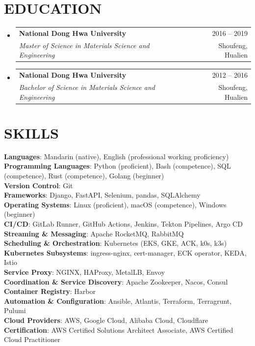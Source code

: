 \documentclass[letterpaper,11pt]{article}
\makeatletter
\newcommand{\resumeSubheading}[4]{
  \vspace{-1pt}\item
    \begin{tabular*}{\textwidth}[t]{l@{\extracolsep{\fill}}r}
      \textbf{#1} & {\color{dark-grey}\small #2}\vspace{1pt}\\
      \textit{#3} & {\color{dark-grey} \small #4}\\
    \end{tabular*}\vspace{-4pt}
}
\newcommand{\resumeSubHeadingListStart}{\begin{itemize}[leftmargin=0in, label={}]}
\newcommand{\resumeSubHeadingListEnd}{\end{itemize}}
\makeatother
\begin{document}
\section{EDUCATION}
\resumeSubHeadingListStart
\resumeSubheading
  {National Dong Hwa University}{2016 -- 2019}
  {Master of Science in Materials Science and Engineering}{Shoufeng, Hualien}

\resumeSubheading
  {National Dong Hwa University}{2012 -- 2016}
  {Bachelor of Science in Materials Science and Engineering}{Shoufeng, Hualien}
\resumeSubHeadingListEnd

\section{SKILLS}
 \begin{itemize}[leftmargin=0in, label={}]
    \small{\item{
     \textbf{Languages}{: Mandarin (native), English (professional working proficiency)} \\
     \textbf{Programming Languages}{: Python (proficient), Bash (competence), SQL (competence), Rust (competence), Golang (beginner)} \\
     \textbf{Version Control}{: Git} \\
     \textbf{Frameworks}{: Django, FastAPI, Selenium, pandas, SQLAlchemy} \\
     \textbf{Operating Systems}{: Linux (proficient), macOS (competence), Windows (beginner)} \\
     \textbf{CI/CD}{: GitLab Runner, GitHub Actions, Jenkins, Tekton Pipelines, Argo CD} \\
     \textbf{Streaming \& Messaging}{: Apache RocketMQ, RabbitMQ} \\
     \textbf{Scheduling \& Orchestration}{: Kubernetes (EKS, GKE, ACK, k0s, k3s)} \\
     \textbf{Kubernetes Subsystems}{: ingress-nginx, cert-manager, ECK operator, KEDA, Istio} \\
     \textbf{Service Proxy}{: NGINX, HAProxy, MetalLB, Envoy} \\
     \textbf{Coordination \& Service Discovery}{: Apache Zookeeper, Nacos, Consul} \\
     \textbf{Container Registry}{: Harbor} \\
     \textbf{Automation \& Configuration}{: Ansible, Atlantis, Terraform, Terragrunt, Pulumi} \\
     \textbf{Cloud Providers}{: AWS, Google Cloud, Alibaba Cloud, Cloudflare} \\
     \textbf{Certification}{: AWS Certified Solutions Architect Associate, AWS Certified Cloud Practitioner}
    }}
 \end{itemize}
\end{document}
